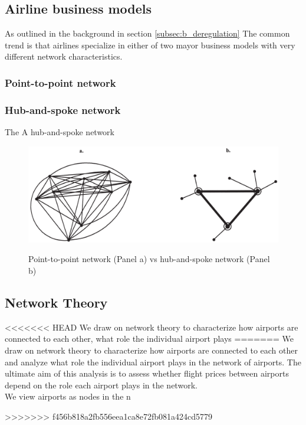 \label{sec:theory}

\subsection{Airline business models}
As outlined in the background in section \ref{subsec:b_deregulation} The common trend is that airlines specialize in either of two mayor business models with very different network characteristics.

\subsubsection{Point-to-point network}


\subsubsection{Hub-and-spoke network}
The
A hub-and-spoke network




\begin{figure}[H]
  \centering
  \caption{Point-to-point network (Panel a) vs hub-and-spoke network (Panel b)}
    \includegraphics[width=1. \textwidth]{03_figures/Bryan_1999_networks}
  \label{fig:Bryan1999}
\end{figure}



\subsection{Network Theory}
\label{subsec:Network Theory}
<<<<<<< HEAD
We draw on network theory to characterize how airports are connected to each other, what role the individual airport plays
=======
We draw on network theory to characterize how airports are connected to each other and analyze what role the individual airport plays in the network of airports. The ultimate aim of this analysis is to assess whether flight prices between airports depend on the role each airport plays in the network. \\
We view airports as nodes in the n

>>>>>>> f456b818a2fb556eea1ca8e72fb081a424cd5779


